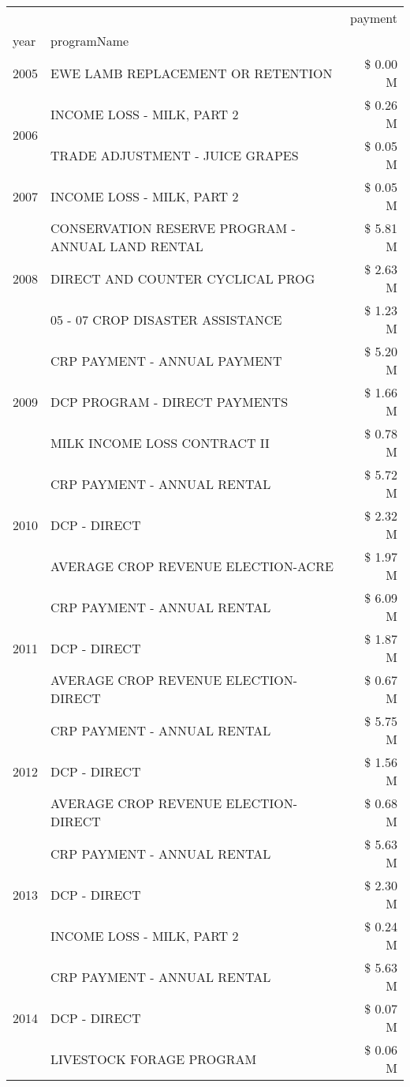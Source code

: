 \begin{tabular}{llr}
\toprule
 &  & payment \\
year & programName &  \\
\midrule
2005 & EWE LAMB REPLACEMENT OR RETENTION & \$ 0.00 M \\
\cline{1-3}
\multirow[t]{2}{*}{2006} & INCOME LOSS - MILK, PART 2 & \$ 0.26 M \\
 & TRADE ADJUSTMENT - JUICE GRAPES & \$ 0.05 M \\
\cline{1-3}
2007 & INCOME LOSS - MILK, PART 2 & \$ 0.05 M \\
\cline{1-3}
\multirow[t]{3}{*}{2008} & CONSERVATION RESERVE PROGRAM - ANNUAL LAND RENTAL & \$ 5.81 M \\
 & DIRECT AND COUNTER CYCLICAL PROG & \$ 2.63 M \\
 & 05 - 07 CROP DISASTER ASSISTANCE & \$ 1.23 M \\
\cline{1-3}
\multirow[t]{3}{*}{2009} & CRP PAYMENT - ANNUAL PAYMENT & \$ 5.20 M \\
 & DCP PROGRAM - DIRECT PAYMENTS & \$ 1.66 M \\
 & MILK INCOME LOSS CONTRACT II & \$ 0.78 M \\
\cline{1-3}
\multirow[t]{3}{*}{2010} & CRP PAYMENT - ANNUAL RENTAL & \$ 5.72 M \\
 & DCP - DIRECT & \$ 2.32 M \\
 & AVERAGE CROP REVENUE ELECTION-ACRE & \$ 1.97 M \\
\cline{1-3}
\multirow[t]{3}{*}{2011} & CRP PAYMENT - ANNUAL RENTAL & \$ 6.09 M \\
 & DCP - DIRECT & \$ 1.87 M \\
 & AVERAGE CROP REVENUE ELECTION-DIRECT & \$ 0.67 M \\
\cline{1-3}
\multirow[t]{3}{*}{2012} & CRP PAYMENT - ANNUAL RENTAL & \$ 5.75 M \\
 & DCP - DIRECT & \$ 1.56 M \\
 & AVERAGE CROP REVENUE ELECTION-DIRECT & \$ 0.68 M \\
\cline{1-3}
\multirow[t]{3}{*}{2013} & CRP PAYMENT - ANNUAL RENTAL & \$ 5.63 M \\
 & DCP - DIRECT & \$ 2.30 M \\
 & INCOME LOSS - MILK, PART 2 & \$ 0.24 M \\
\cline{1-3}
\multirow[t]{3}{*}{2014} & CRP PAYMENT - ANNUAL RENTAL & \$ 5.63 M \\
 & DCP - DIRECT & \$ 0.07 M \\
 & LIVESTOCK FORAGE PROGRAM & \$ 0.06 M \\

\end{tabular}
